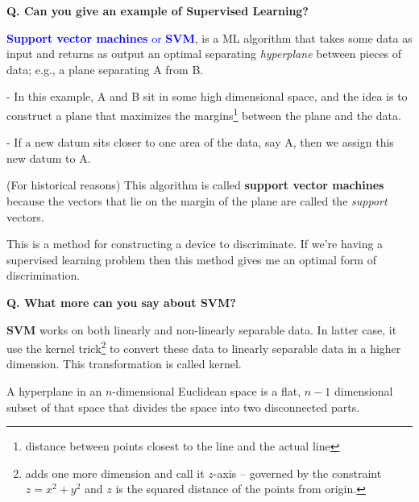 \begin{frame}[fragile]{\textbf{Q. Can you give an example of Supervised Learning?}}
  \vspace{.4em}
  \begin{wideitemize}
    \item \textcolor{blue}{\textbf{Support vector machines} or \textbf{SVM}},
    is a ML algorithm that takes some data as input and returns as output
    an optimal separating \textit{hyperplane} between pieces of data; e.g., a plane separating A from B.
    \begin{wideitemize}
      \item[-] In this example, A and B sit in some high dimensional space, and the idea is to
      construct a plane that maximizes the margins\footnote{distance between points closest
      to the line and the actual line} between the plane and the data.
      \item[-] If a new datum sits closer to one area of the data, say A, then
      we assign this new datum to A.
    \end{wideitemize}
    \item (For historical reasons) This algorithm is called \textbf{support
    vector machines} because the vectors that lie on the margin of the plane are
    called the \textit{support} vectors.
  \end{wideitemize}

  \begin{framed}
  This is a method for constructing a device to discriminate. If we're having
  a supervised learning problem then this method gives me an optimal form of
  discrimination.
  \end{framed}

\end{frame}



\begin{frame}[fragile]{\textbf{Q. What more can you say about SVM?}}
  \vspace{.4em}
  \begin{wideitemize}
    \item \textbf{SVM} works on both linearly and non-linearly separable data. In latter case, it use
    the kernel trick\footnote{adds one more dimension and call it $z$-axis -- governed by the
    constraint $z = x^2 + y^2$ and $z$ is the squared distance of the points from origin.} to convert
    these data to linearly separable data in a higher dimension. This transformation is called kernel.
    \item A hyperplane in an $n$-dimensional Euclidean space is a flat, $n-1$ dimensional subset of that
    space that divides the space into two disconnected parts.
  \end{wideitemize}

\end{frame}

